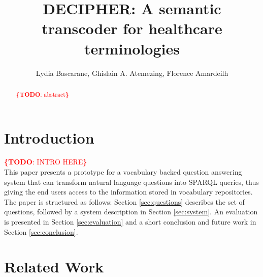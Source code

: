 \documentclass[runningheads,a4paper]{llncs}
\newcommand{\todo}[1]{\noindent\textcolor{red}{{\bf \{TODO}: #1{\bf \}}}}
\begin{document}
\title{DECIPHER: A semantic transcoder for healthcare terminologies}

\author{Lydia Bascarane, Ghislain A. Atemezing, Florence Amardeilh }


\maketitle



\begin{abstract}

\todo{abstract}

\end{abstract}




\section{Introduction}
\label{sec:introduction}

\todo{INTRO HERE} \\

This paper presents a prototype for a vocabulary backed question answering system that can transform natural language questions into SPARQL queries, thus giving the end users access to the information stored in vocabulary repositories. The paper is structured as follows: Section \ref{sec:questions} describes the set of questions, followed by a system description in Section \ref{sec:system}. An evaluation is presented in Section \ref{sec:evaluation} and a short conclusion and future work in Section \ref{sec:conclusion}.  



\section{Related Work}
\label{sec:soa}
\end{document}
